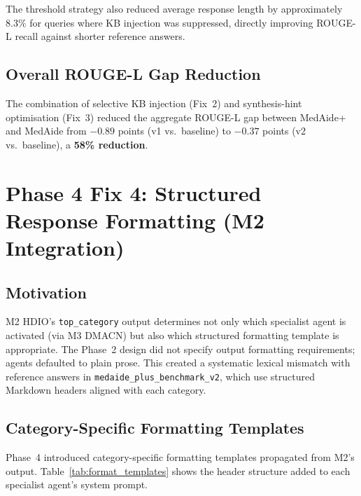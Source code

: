 \documentclass[a4paper,12pt]{article}
\begin{document}
The threshold strategy also reduced average response length by approximately
$8.3\%$ for queries where KB injection was suppressed, directly improving
ROUGE-L recall against shorter reference answers.

\subsection{Overall ROUGE-L Gap Reduction}

The combination of selective KB injection (Fix~2) and synthesis-hint
optimisation (Fix~3) reduced the aggregate ROUGE-L gap between MedAide+
and MedAide from $-0.89$ points (v1 vs.\ baseline) to $-0.37$ points
(v2 vs.\ baseline), a \textbf{58\% reduction}.

\section{Phase 4 Fix 4: Structured Response Formatting (M2 Integration)}

\subsection{Motivation}

M2 HDIO's \texttt{top\_category} output determines not only which
specialist agent is activated (via M3 DMACN) but also which structured
formatting template is appropriate. The Phase~2 design did not specify
output formatting requirements; agents defaulted to plain prose. This
created a systematic lexical mismatch with reference answers in
\texttt{medaide\_plus\_benchmark\_v2}, which use structured Markdown
headers aligned with each category.

\subsection{Category-Specific Formatting Templates}

Phase~4 introduced category-specific formatting templates propagated
from M2's output. Table~\ref{tab:format_templates} shows the header
structure added to each specialist agent's system prompt.
\end{document}
